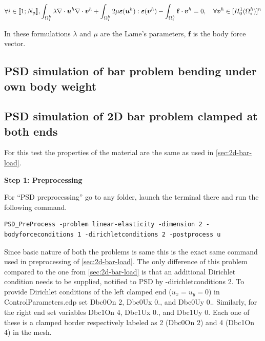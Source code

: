 \begin{equation}\label{Eq:LinearElasticity}
\forall i \in \llbracket 1; N_{\text p} \rrbracket, 
\int_{\Omega^h_i}\lambda\nabla\cdot\boldsymbol u^h\nabla\cdot\boldsymbol v^h + \int_{\Omega^h_i}2\mu\boldsymbol\varepsilon(\boldsymbol u^h):\boldsymbol\varepsilon(\boldsymbol v^h)-\int_{\Omega^h_i}\mathbf{f}\cdot\boldsymbol v^h=0, \quad\forall\boldsymbol v^h\in[H^1_0(\Omega^h_i)]^n 
\end{equation}

In these formulations $\lambda$ and $\mu$ are the Lame's parameters, $\mathbf{f}$ is the body force vector.  

\subsection{PSD simulation of bar problem bending under own body weight \label{sec:2d-bar-load}}

{
	\renewcommand{\subsection}{\subsubsection}
	
}



\subsection{PSD simulation of 2D bar problem clamped at both ends \label{sec:2D-bar-clamped1}}

For this test the properties of the material are the same as used in \cref{sec:2d-bar-load}. 

\textbf{Step 1: Preprocessing}

For ``PSD preprocessing'' go to any folder, launch the terminal there and run the following command.
\begin{lstlisting}[style=BashInputStyle]
PSD_PreProcess -problem linear-elasticity -dimension 2 -bodyforceconditions 1 -dirichletconditions 2 -postprocess u
\end{lstlisting}
%
Since basic nature of both the problems is same this is the exact same command used in preprocessing of \cref{sec:2d-bar-load}. The only difference of this problem compared to the one from \cref{sec:2d-bar-load} is that an additional Dirichlet condition needs to be supplied, notified to PSD by {\ttfamily -dirichletconditions 2}. To provide Dirichlet conditions of the left clamped end ($u_x=u_y=0$) in {\ttfamily ControlParameters.edp} set {\ttfamily Dbc0On 2}, {\ttfamily Dbc0Ux 0.}, and {\ttfamily Dbc0Uy 0.}. Similarly, for the right end set variables {\ttfamily Dbc1On 4}, {\ttfamily Dbc1Ux 0.}, and {\ttfamily Dbc1Uy 0}. Each one of these is a clamped border respectively labeled as 2  ({\ttfamily Dbc0On 2}) and 4 ({\ttfamily Dbc1On 4}) in the mesh.

